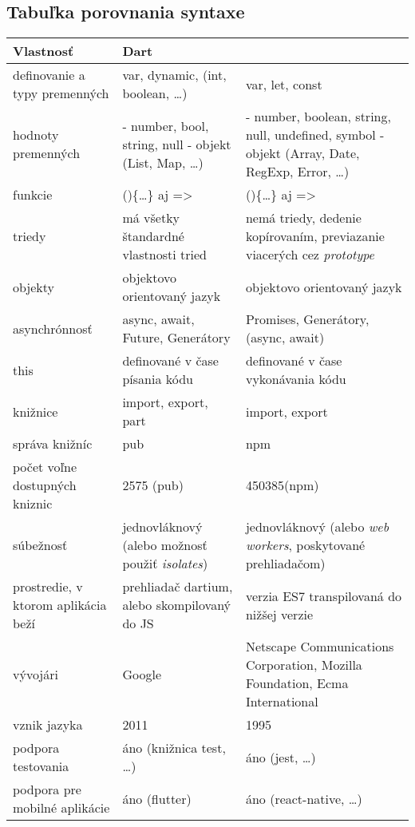 \subsection{Tabuľka porovnania syntaxe}
\label{tab:compare}

\begin{tabular}{| p{4cm} | p{5cm} | p{5cm} |}
 \hline         %
   Vlastnosť & Dart & \JS{} \\ %
  \hline
  \hline
   definovanie a typy premenných & 
   var, dynamic,  (int, boolean, \ldots)& %
   var, let, const \\
  \hline
   hodnoty premenných & 
   - number, bool, string, null \newline
   - objekt (List, Map, \ldots)
    & 
   - number, boolean, string, null, undefined, symbol \newline
   - objekt (Array, Date, Reg\-Exp, Error, \ldots)
    \\
  \hline
   funkcie & 
   ()\{\ldots\} aj => & 
   ()\{\ldots\} aj => \\
  \hline
   triedy & 
   má všetky štandardné vlastnosti tried & 
   nemá triedy, dedenie kopírovaním, previazanie viacerých cez \emph{prototype} \\
  \hline
   objekty & 
   objektovo orientovaný jazyk & 
   objektovo orientovaný jazyk \\
  \hline
   asynchrónnosť &
   async, await, Future, Generátory & 
   Promises, Generátory, (async, await) \\
  \hline
   this & 
   definované v čase písania kódu & 
   definované v čase vykonávania kódu \\
  \hline
   knižnice & 
   import, export, part & 
   import, export \\
  \hline
   správa knižníc & 
   pub & 
   npm \\
  \hline
   počet voľne dostupných kniznic & 
   2575 (pub) & 
   450385\footnotemark (npm) \\
  \hline
   súbežnosť & 
   jednovláknový (alebo možnosť použiť \emph{isolates}) & 
   jednovláknový (alebo \emph{web workers}, poskytované prehliadačom) \\
  \hline
   prostredie, v ktorom aplikácia beží & 
   prehliadač dartium, alebo skompilovaný do JS & 
   verzia ES7 transpilovaná do nižšej verzie \\
  \hline
   vývojári & 
   Google & 
   Netscape Communications Corporation, Mozilla Foundation, Ecma International \\
  \hline
   vznik jazyka & 
   2011 & 
   1995 \\
  \hline
   podpora testovania & 
   áno (knižnica test, \ldots) & 
   áno (jest, \ldots) \\
  \hline
  podpora pre mobilné aplikácie & 
  áno (flutter) & 
  áno (react-native, \ldots) \\
  \hline
 \end{tabular}
